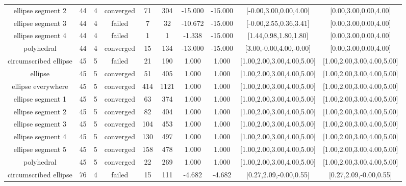 \begin{tiny}
\begin{center}
\begin{longtable}{ c c c c c c c c c c }
    ellipse segment 2     &   44  &  4  & converged  &   71  &  304  &  -15.000   &  -15.000   & [-0.00,3.00,0.00,4.00] & [0.00,3.00,0.00,4.00] \\
    ellipse segment 3     &   44  &  4  &   failed   &   7   &   32  &  -10.672   &  -15.000   & [-0.00,2.55,0.36,3.41] & [0.00,3.00,0.00,4.00] \\
    ellipse segment 4     &   44  &  4  &   failed   &   1   &   1   &   -1.338   &  -15.000   & [1.44,0.98,1.80,1.80] & [0.00,3.00,0.00,4.00] \\
        polyhedral        &   44  &  4  & converged  &   15  &  134  &  -13.000   &  -15.000   & [3.00,-0.00,4.00,-0.00] & [0.00,3.00,0.00,4.00] \\
  circumscribed ellipse   &   45  &  5  &   failed   &   21  &  190  &   1.000    &   1.000    & [1.00,2.00,3.00,4.00,5.00] & [1.00,2.00,3.00,4.00,5.00] \\
         ellipse          &   45  &  5  & converged  &   51  &  405  &   1.000    &   1.000    & [1.00,2.00,3.00,4.00,5.00] & [1.00,2.00,3.00,4.00,5.00] \\
    ellipse everywhere    &   45  &  5  & converged  &  414  &  1121 &   1.000    &   1.000    & [1.00,2.00,3.00,4.00,5.00] & [1.00,2.00,3.00,4.00,5.00] \\
    ellipse segment 1     &   45  &  5  & converged  &   63  &  374  &   1.000    &   1.000    & [1.00,2.00,3.00,4.00,5.00] & [1.00,2.00,3.00,4.00,5.00] \\
    ellipse segment 2     &   45  &  5  & converged  &   82  &  404  &   1.000    &   1.000    & [1.00,2.00,3.00,4.00,5.00] & [1.00,2.00,3.00,4.00,5.00] \\
    ellipse segment 3     &   45  &  5  & converged  &  104  &  453  &   1.000    &   1.000    & [1.00,2.00,3.00,4.00,5.00] & [1.00,2.00,3.00,4.00,5.00] \\
    ellipse segment 4     &   45  &  5  & converged  &  130  &  497  &   1.000    &   1.000    & [1.00,2.00,3.00,4.00,5.00] & [1.00,2.00,3.00,4.00,5.00] \\
    ellipse segment 5     &   45  &  5  & converged  &  158  &  478  &   1.000    &   1.000    & [1.00,2.00,3.00,4.00,5.00] & [1.00,2.00,3.00,4.00,5.00] \\
        polyhedral        &   45  &  5  & converged  &   22  &  269  &   1.000    &   1.000    & [1.00,2.00,3.00,4.00,5.00] & [1.00,2.00,3.00,4.00,5.00] \\
  circumscribed ellipse   &   76  &  4  &   failed   &   15  &  111  &   -4.682   &   -4.682   & [0.27,2.09,-0.00,0.55] & [0.27,2.09,-0.00,0.55] \\

\end{longtable}
\end{center}
\end{tiny}
